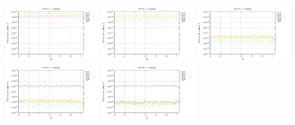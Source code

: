 \noindent
\includegraphics[width=3.5cm]{python_codes/fieldstone_152/RESULTS/exp1_2D/sr2_32_m2}
\includegraphics[width=3.5cm]{python_codes/fieldstone_152/RESULTS/exp1_2D/sr2_32_m3}
\includegraphics[width=3.5cm]{python_codes/fieldstone_152/RESULTS/exp1_2D/sr2_32_m4}
\includegraphics[width=3.5cm]{python_codes/fieldstone_152/RESULTS/exp1_2D/sr2_32_m5}
\includegraphics[width=3.5cm]{python_codes/fieldstone_152/RESULTS/exp1_2D/sr2_32_m6}

